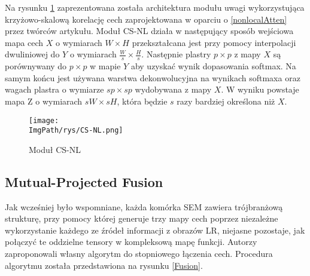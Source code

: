 \documentclass[a4paper,12pt,twoside,openany]{report}
\newcommand{\ImgPath}{.}
\begin{document}
	Na rysunku \ref{CS-NL} zaprezentowana została architektura modułu uwagi wykorzystująca krzyżowo-skalową korelację cech zaprojektowana w oparciu o \ref{nonlocalAtten} przez twórców artykułu. Moduł CS-NL działa w następujący sposób wejściowa mapa cech $X$ o wymiarach $W \times H$ przekształcana jest przy pomocy interpolacji dwuliniowej do $Y$ o wymiarach $\frac{W}{s} \times \frac{H}{s}$. Następnie plastry $p \times p$ z mapy $X$ są porównywany do $p \times p$ w mapie $Y$ aby uzyskać wynik dopasowania softmax. Na samym końcu jest używana warstwa dekonwolucyjna na wynikach softmaxa oraz wagach plastra o wymiarze $sp \times sp$ wydobywana z mapy $X$. W wyniku powstaje mapa Z o wymiarach $sW \times sH$, która będzie $s$ razy bardziej określona niż $X$.
	
	\begin{figure}[!htbp]
		\begin{center}
			\centering
			\texttt{[image: \\ImgPath/rys/CS-NL.png]}
		\end{center}
		\caption{Moduł CS-NL}
		\label{CS-NL}
	\end{figure} 


	\subsection{Mutual-Projected Fusion}
	Jak wcześniej było wspomniane, każda komórka SEM zawiera trójbranżową strukturę, przy pomocy której generuje trzy mapy cech poprzez niezależne wykorzystanie każdego ze źródeł informacji z obrazów LR, niejasne pozostaje, jak połączyć te oddzielne tensory w kompleksową mapę funkcji. Autorzy zaproponowali własny algorytm do stopniowego łączenia cech. Procedura algorytmu została przedstawiona na rysunku \ref{Fusion}.
	
\end{document}
